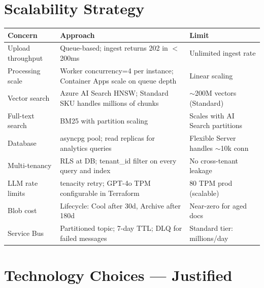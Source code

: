 \documentclass[12pt,a4paper]{article}
\begin{document}
\newpage

\section{Scalability Strategy}

\begin{tabularx}{\textwidth}{lXl}
\toprule
\textbf{Concern} & \textbf{Approach} & \textbf{Limit} \\
\midrule
Upload throughput & Queue-based; ingest returns 202 in $<$200ms & Unlimited ingest rate \\
Processing scale & Worker concurrency=4 per instance; Container Apps scale on queue depth & Linear scaling \\
Vector search & Azure AI Search HNSW; Standard SKU handles millions of chunks & $\sim$200M vectors (Standard) \\
Full-text search & BM25 with partition scaling & Scales with AI Search partitions \\
Database & asyncpg pool; read replicas for analytics queries & Flexible Server handles $\sim$10k conn \\
Multi-tenancy & RLS at DB; tenant\_id filter on every query and index & No cross-tenant leakage \\
LLM rate limits & tenacity retry; GPT-4o TPM configurable in Terraform & 80 TPM prod (scalable) \\
Blob cost & Lifecycle: Cool after 30d, Archive after 180d & Near-zero for aged docs \\
Service Bus & Partitioned topic; 7-day TTL; DLQ for failed messages & Standard tier: millions/day \\
\bottomrule
\end{tabularx}

\newpage

\section{Technology Choices — Justified}
\end{document}
